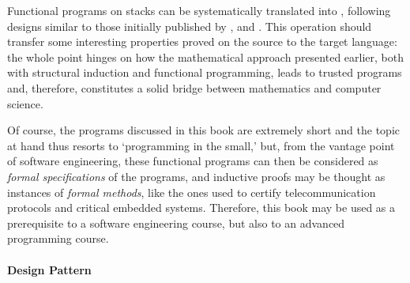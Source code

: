 \label{par:java}

Functional programs on stacks can be systematically translated into
\Java, following designs similar to those initially published
by \cite{FelleisenFriedman_1997}, \cite{Bloch_2003}
and \cite{Sher_2004}. This operation should transfer some interesting
properties proved on the source to the target language: the whole
point hinges on how the mathematical approach presented earlier, both
with structural induction and functional programming, leads to trusted
\Java programs and, therefore, constitutes a solid bridge between
mathematics and computer science.

Of course, the programs discussed in this book are extremely short and
the topic at hand thus resorts to `programming in the small,' but,
from the vantage point of software engineering, these functional
programs can then be considered as \emph{formal specifications} of the
\Java programs, and inductive proofs may be thought as instances of
\emph{formal methods}, like the ones used to certify telecommunication
protocols and critical embedded systems. Therefore, this book may be
used as a prerequisite to a software engineering course, but also to
an advanced programming course.

\paragraph{Design Pattern}

